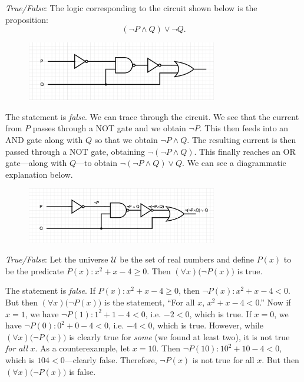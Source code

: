 \documentclass[11pt,letterpaper]{article}
\begin{document}
\quizsol \textit{True/False}: The logic corresponding to the circuit shown below is the proposition:
	\[
	(\neg P \wedge Q) \vee \neg Q.
	\]
	\begin{figure}[!ht]
	\centering
	\includegraphics[width=0.74\textwidth]{images/circuit}
	\end{figure} \par

\newpage

\sol The statement is \textit{false}. We can trace through the circuit. We see that the current from $P$ passes through a NOT gate and we obtain $\neg P$. This then feeds into an AND gate along with $Q$ so that we obtain $\neg P \wedge Q$. The resulting current is then passed through a NOT gate, obtaining $\neg (\neg P \wedge Q)$. This finally reaches an OR gate---along with $Q$---to obtain $\neg (\neg P \wedge Q) \vee Q$. We can see a diagrammatic explanation below. \par
	\begin{figure}[!ht]
	\centering
	\includegraphics[width=0.74\textwidth]{images/circuit_sol}
	\end{figure} \pvspace{1.5cm}



\quizsol \textit{True/False}: Let the universe $\mathcal{U}$ be the set of real numbers and define $P(x)$ to be the predicate $P(x): x^2 + x - 4 \geq 0$. Then $(\forall x) \big(\neg P(x) \big)$ is true. \pspace

\sol The statement is \textit{false}. If $P(x): x^2 + x - 4 \geq 0$, then $\neg P(x): x^2 + x - 4 < 0$. But then $(\forall x) \big(\neg P(x) \big)$ is the statement, ``For all $x$, $x^2 + x - 4 < 0$.'' Now if $x= 1$, we have $\neg P(1) \colon 1^2 + 1 - 4 < 0$, i.e. $-2 < 0$, which is true. If $x= 0$, we have $\neg P(0) \colon 0^2 + 0 - 4 < 0$, i.e. $-4 < 0$, which is true. However, while $(\forall x) \big(\neg P(x) \big)$ is clearly true for \textit{some} (we found at least two), it is not true \textit{for all} $x$. As a counterexample, let $x= 10$. Then $\neg P(10) \colon 10^2 + 10 - 4 < 0$, which is $104 < 0$---clearly false. Therefore, $\neg P(x)$ is not true for all $x$. But then $(\forall x) \big(\neg P(x) \big)$ is false. \pvspace{1.5cm}
\end{document}
